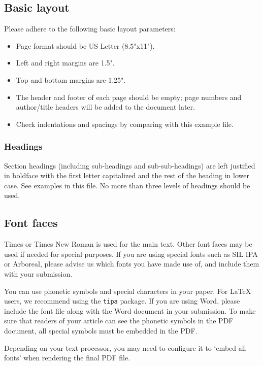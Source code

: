 \documentclass{tls}
\begin{document}
\subsection{Basic layout}

Please adhere to the following basic layout parameters:

\begin{itemize}
  \item Page format should be US Letter (8.5"x11").
  \item Left and right margins are 1.5".
  \item Top and bottom margins are 1.25".
  \item The header and footer of each page should be empty; page numbers and author/title headers will be added to the document later.
  \item Check indentations and spacings by comparing with this example file.
\end{itemize}

\subsubsection{Headings}

Section headings (including sub-headings and sub-sub-headings) are left justified in boldface with the first letter capitalized and the rest of the heading in lower case. See examples in this file. No more than three levels of headings should be used.

\subsection{Font faces}

Times or Times New Roman is used for the main text. Other font faces may be used if needed for special purposes. If you are using special fonts such as SIL IPA or Arboreal, please advise us which fonts you have made use of, and include them with your submission.

You can use phonetic symbols and special characters in your paper. For \LaTeX{} users, we recommend using the \texttt{tipa} package. If you are using Word, please include the font file along with the Word document in your submission. To make sure that readers of your article can see the phonetic symbols in the PDF document, all special symbols must be embedded in the PDF.

Depending on your text processor, you may need to configure it to `embed all fonts' when rendering the final PDF file.
\end{document}
